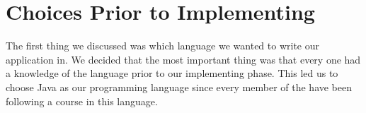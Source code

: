 \chapter{Choices Prior to Implementing}
The first thing we discussed was which language we wanted to write our application in.
We decided that the most important thing was that every one had a knowledge of the language prior to our implementing phase.
This led us to choose Java as our programming language since every member of the have been following a course in this language.

